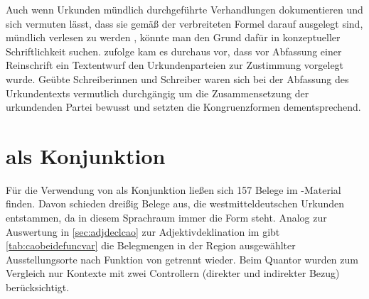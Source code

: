 Auch wenn Urkunden mündlich durchgeführte Verhandlungen dokumentieren und sich
vermuten lässt, dass sie gemäß der verbreiteten Formel 
 darauf ausgelegt sind, mündlich verlesen zu werden
\autocites[595]{schmidtwiegand1998b}[31]{schulze2011}, könnte man den Grund
dafür in konzeptueller Schriftlichkeit suchen. \citet[588--589]{frenz1998b}
zufolge kam es durchaus vor, dass vor Abfassung einer Reinschrift ein
Textentwurf den Urkundenparteien zur Zustimmung vorgelegt wurde. Geübte
Schreiberinnen und Schreiber waren sich bei der Abfassung des Urkundentexts
vermutlich durchgängig um die Zusammensetzung der urkundenden Partei bewusst
und setzten die Kongruenzformen dementsprechend.



\section{ als Konjunktion}
\label{sec:caokonjunktion}

Für die Verwendung von  als Konjunktion ließen sich 157 Belege im
\CAO{}-Material finden. Davon schieden dreißig Belege aus, die
westmitteldeutschen Urkunden entstammen, da in diesem Sprachraum immer die Form
 steht. Analog zur Auswertung in \cref{sec:adjdeclcao} zur
Adjektivdeklination im \CAO{} gibt \cref{tab:caobeidefuncvar} die
Belegmengen in der Region ausgewählter Ausstellungs\-orte nach Funktion von
 getrennt wieder. Beim Quantor wurden zum Vergleich nur Kontexte
mit zwei Controllern (direkter und indirekter Bezug) berücksichtigt.

